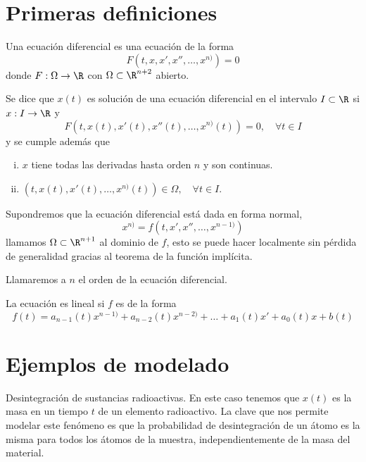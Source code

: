 \documentclass[../main.tex]{subfiles}
\begin{document}
\section{Primeras definiciones}

\begin{definition}
	Una ecuación diferencial es una ecuación de la forma 
	\[F(t, x, x', x'', \dots, x^{n)}) = 0\]
	donde \(F : \Omega \to \R\) con \(\Omega \subset \R^{n + 2}\) abierto.
\end{definition}

Se dice que \(x(t)\) es solución de una ecuación diferencial en el intervalo 
\(I \subset \R\) si \(x : I \to \R\) y
\[F(t, x(t), x'(t), x''(t), \dots, x^{n)}(t)) = 0, \quad \forall t \in I\]
y se cumple además que
\begin{enumerate}[i)]
	\item \(x\) tiene todas las derivadas hasta orden \(n\) y son continuas.
	\item \((t, x(t), x'(t), \dots, x^{n)}(t)) \in \Omega, \quad \forall t \in I\).
\end{enumerate}

Supondremos que la ecuación diferencial está dada en forma normal,
\[x^{n)} = f(t, x', x'', \dots, x^{n - 1)})\]
llamamos \(\Omega \subset \R^{n + 1}\) al dominio de \(f\), esto se puede hacer
localmente sin pérdida de generalidad gracias al teorema de la función
implícita.

\begin{definition}
	Llamaremos a \(n\) el orden de la ecuación diferencial.
\end{definition}

\begin{definition}
	La ecuación es lineal si \(f\) es de la forma
	\[f(t) = a_{n - 1}(t)x^{n - 1)} + a_{n - 2}(t)x^{n - 2)} + 
		\dots + a_1(t)x' + a_0(t)x + b(t)\]
\end{definition}

\section{Ejemplos de modelado}

Desintegración de sustancias radioactivas. En este caso tenemos que \(x(t)\) es
la masa en un tiempo \(t\) de un elemento radioactivo. La clave que nos permite
modelar este fenómeno es que la probabilidad de desintegración de un átomo es la
misma para todos los átomos de la muestra, independientemente de la masa del
material.
\end{document}
